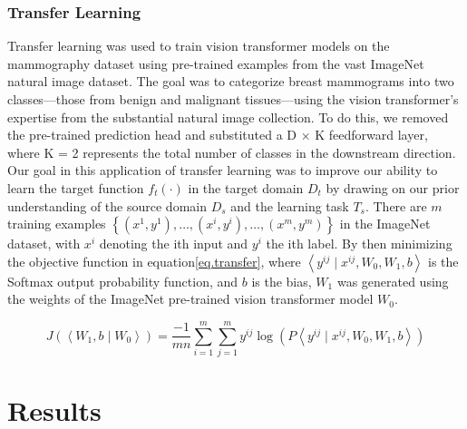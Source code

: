\documentclass{article}
\begin{document}
\subsubsection{Transfer Learning}
Transfer learning was used to train vision transformer models on the mammography dataset using pre-trained examples from the vast ImageNet natural image dataset. The goal was to categorize breast mammograms into two classes—those from benign and malignant tissues—using the vision transformer's expertise from the substantial natural image collection. To do this, we removed the pre-trained prediction head and substituted a D $\times$ K feedforward layer, where K = 2 represents the total number of classes in the downstream direction. Our goal in this application of transfer learning was to improve our ability to learn the target function $f_t(\cdot)$ in the target domain $D_t$ by drawing on our prior understanding of the source domain $D_s$ and the learning task $T_s$. There are $m$ training examples $\left\{\left(x^1, y^1\right), \ldots,\left(x^i, y^i\right), \ldots,\left(x^m, y^m\right)\right\}$ in the ImageNet dataset, with $x^i$ denoting the ith input and $y^i$ the ith label. By then minimizing the objective function in equation\ref{eq.transfer}, where $\left\langle y^{i j} \mid x^{i j}, W_0, W_1, b\right\rangle$ is the Softmax output probability function, and $b$ is the bias, $W_1$ was generated using the weights of the ImageNet pre-trained vision transformer model $W_0$.

\begin{equation}
J\left(\left\langle W_1, b \mid W_0\right\rangle\right)=\frac{-1}{m n} \sum_{i=1}^m \sum_{j=1}^m y^{i j} \log \left(P\left\langle y^{i j} \mid x^{i j}, W_0, W_1, b\right\rangle\right)
\label{eq.transfer}
\end{equation}

\section{Results}
\end{document}
